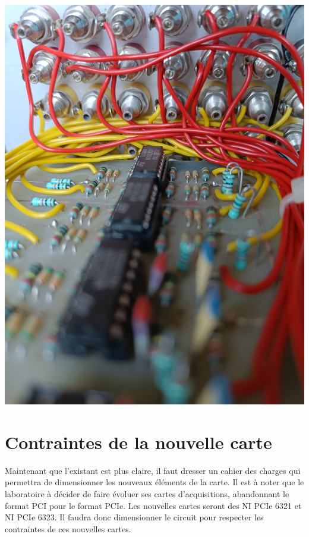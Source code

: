 \documentclass{report}
\begin{document}
\begin{minipage}{0.45\textwidth}
\centering
\includegraphics[scale=.0605]{IMAGES/liaison_pcb_old.jpg} 

\label{fig:liaison_pcb_old}
\end{minipage}

\chapter{Contraintes de la nouvelle carte}
\thispagestyle{empty}

Maintenant que l'existant est plus claire, il faut dresser un cahier des charges qui permettra de dimensionner les nouveaux éléments de la carte. Il est à noter que le laboratoire à décider de faire évoluer ses cartes d'acquisitions, abandonnant le format PCI pour le format PCIe. Les nouvelles cartes seront des NI PCIe 6321 et NI PCIe 6323. Il faudra donc dimensionner le circuit pour respecter les contraintes de ces nouvelles cartes.
\end{document}
